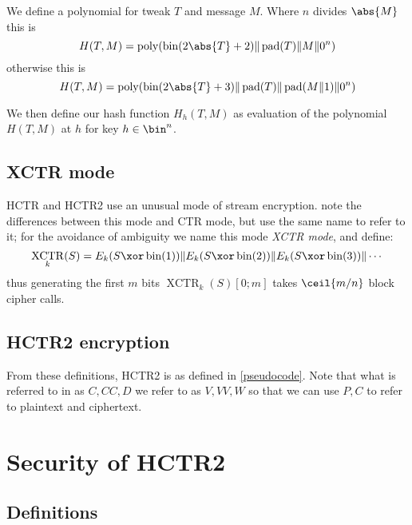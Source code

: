 \documentclass[letterpaper,11pt]{article}
\newcommand*{\Concat}{\Vert}
\DeclareMathOperator{\fromint}{bin}
\DeclareMathOperator{\pad}{pad}
\DeclareMathOperator{\poly}{poly}
\DeclareMathOperator{\XCTR}{XCTR}
\begin{document}
We define a polynomial for tweak \(T\) and message \(M\). Where \(n\) divides
\(\abs{M}\) this is
\begin{displaymath}
    H(T, M) = \poly(\fromint(2\abs{T} + 2) \Concat \pad(T) \Concat M \Concat 0^n)
\end{displaymath}
otherwise this is
\begin{displaymath}
    H(T, M) = \poly(\fromint(2\abs{T} + 3) \Concat \pad(T) \Concat \pad(M \Concat 1) \Concat 0^n)
\end{displaymath}

We then define our hash function \(H_h(T, M)\) as evaluation
of the polynomial \(H(T, M)\) at \(h\) for key \(h \in \bin^n\).

\subsection{XCTR mode}

HCTR and HCTR2 use an unusual mode of stream encryption.
\cite{hctr,hctrquad} note the differences between this mode and CTR mode,
but use the same name to refer to it; for the avoidance of ambiguity
we name this mode \emph{XCTR mode}, and define:
\begin{displaymath}
    \XCTR_k(S) = E_k(S \xor \fromint(1)) \Concat E_k(S \xor \fromint(2)) \Concat E_k(S \xor \fromint(3)) \Concat \cdots
\end{displaymath}
thus generating the first \(m\) bits \(\XCTR_k(S)[0; m]\) takes \(\ceil{m/n}\) block cipher calls.

\subsection{HCTR2 encryption}

From these definitions, HCTR2 is as defined in \autoref{pseudocode}.
Note that what is referred to in \cite{hctr,hctrquad} as \(C, \mathit{CC}, D\)
we refer to as \(V, VV, W\)
so that we can use \(P, C\) to refer to plaintext and ciphertext.

\section{Security of HCTR2}
\subsection{Definitions}
\end{document}

